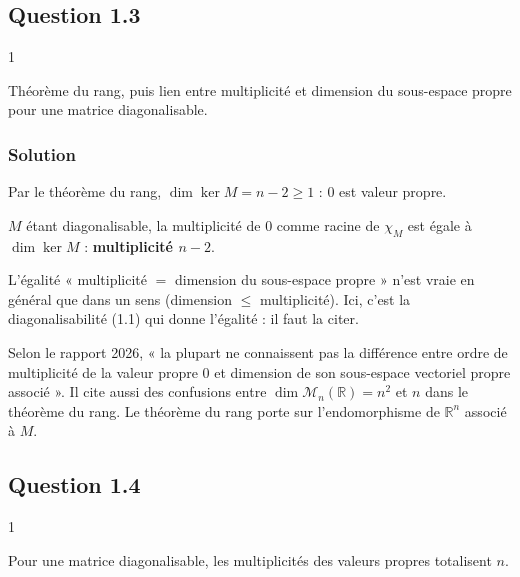 \documentclass[11pt,a4paper]{article}
\begin{document}
\hypertarget{question-1.3}{%
\subsection{Question 1.3}\label{question-1.3}}

\begin{indication}{1}

Théorème du rang, puis lien entre multiplicité et dimension du sous-espace propre pour une matrice diagonalisable.

\end{indication}

\hypertarget{solution-32}{%
\subsubsection{Solution}\label{solution-32}}

Par le théorème du rang, \(\dim\ker M=n-2\ge1\) : \(0\) est valeur propre.

\(M\) étant diagonalisable, la multiplicité de \(0\) comme racine de \(\chi_M\) est égale à \(\dim\ker M\) : \textbf{multiplicité \(n-2\)}.

\begin{piege}

L'égalité « multiplicité \(=\) dimension du sous-espace propre » n'est vraie en général que dans un sens (dimension \(\le\) multiplicité). Ici, c'est la diagonalisabilité (1.1) qui donne l'égalité : il faut la citer.

\end{piege}

\begin{jury}

Selon le rapport 2026, « la plupart ne connaissent pas la différence entre ordre de multiplicité de la valeur propre 0 et dimension de son sous-espace vectoriel propre associé ». Il cite aussi des confusions entre \(\dim\mathcal M_n(\mathbb R)=n^2\) et \(n\) dans le théorème du rang. Le théorème du rang porte sur l'endomorphisme de \(\mathbb R^n\) associé à \(M\).

\end{jury}

\hypertarget{question-1.4}{%
\subsection{Question 1.4}\label{question-1.4}}

\begin{indication}{1}

Pour une matrice diagonalisable, les multiplicités des valeurs propres totalisent \(n\).

\end{indication}
\end{document}
